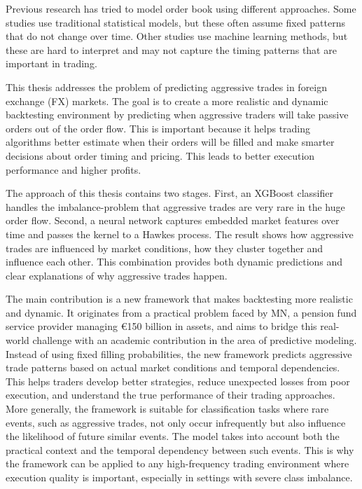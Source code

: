 Previous research has tried to model order book using different approaches. Some studies use traditional statistical models, but these often assume fixed patterns that do not change over time. Other studies use machine learning methods, but these are hard to interpret and may not capture the timing patterns that are important in trading. 

This thesis addresses the problem of predicting aggressive trades in foreign exchange (FX) markets. The goal is to create a more realistic and dynamic backtesting environment by predicting when aggressive traders will take passive orders out of the order flow. This is important because it helps trading algorithms better estimate when their orders will be filled and make smarter decisions about order timing and pricing. This leads to better execution performance and higher profits.

The approach of this thesis contains two stages. First, an XGBoost classifier handles the imbalance-problem that aggressive trades are very rare in the huge order flow. Second, a neural network captures embedded market features over time and passes the kernel to a Hawkes process. The result shows how aggressive trades are influenced by market conditions, how they cluster together and influence each other. This combination provides both dynamic predictions and clear explanations of why aggressive trades happen.

The main contribution is a new framework that makes backtesting more realistic and dynamic. It originates from a practical problem faced by MN, a pension fund service provider managing €150 billion in assets, and aims to bridge this real-world challenge with an academic contribution in the area of predictive modeling. Instead of using fixed filling probabilities, the new framework predicts aggressive trade patterns based on actual market conditions and temporal dependencies. This helps traders develop better strategies, reduce unexpected losses from poor execution, and understand the true performance of their trading approaches. More generally, the framework is suitable for classification tasks where rare events, such as aggressive trades, not only occur infrequently but also influence the likelihood of future similar events. The model takes into account both the practical context and the temporal dependency between such events. This is why the framework can be applied to any high-frequency trading environment where execution quality is important, especially in settings with severe class imbalance. 

